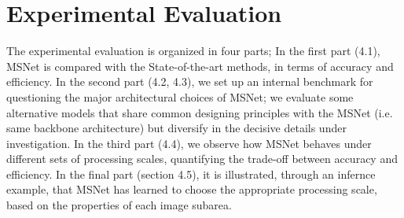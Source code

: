 \documentclass[runningheads]{llncs}
\begin{document}
\begin{table}
    \centering
    \caption{Description of CNN architectures}
    \label{tab:learnable_models}
\end{table}

\section{Experimental Evaluation}

The experimental evaluation is organized in four parts; In the first part (4.1), MSNet is compared with the State-of-the-art methods, in terms of accuracy and efficiency. In the second part (4.2, 4.3), we set up an internal benchmark for questioning the major architectural choices of MSNet; we evaluate some alternative models that share common designing principles with the MSNet (i.e. same backbone architecture) but diversify in the decisive details under investigation. In the third part (4.4), we observe how MSNet behaves under different sets of processing scales, quantifying the trade-off between accuracy and efficiency. In the final part (section 4.5), it is illustrated, through an infernce example, that MSNet has learned to choose the appropriate processing scale, based on the properties of each image subarea.
\end{document}
